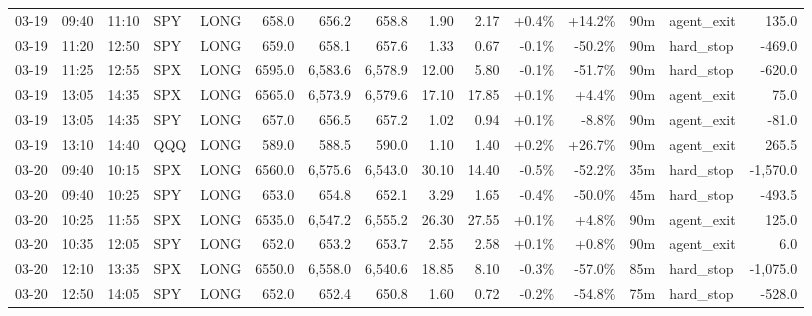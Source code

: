 \documentclass[11pt,a4paper,twoside]{article}
\begin{document}
\begin{landscape}
\begin{center}
\begin{longtable}{>{\color{txtmain}}l l l l l r r r r r r r r >{\color{txtmain}}l r}
03-19 & 09:40 & 11:10 & SPY & LONG & 658.0 & 656.2 & 658.8 & 1.90 & 2.17 & \textcolor{wingreen}{+0.4\%} & \textcolor{wingreen}{+14.2\%} & 90m & agent\_exit & \textcolor{wingreen}{135.0} \\
03-19 & 11:20 & 12:50 & SPY & LONG & 659.0 & 658.1 & 657.6 & 1.33 & 0.67 & \textcolor{lossred}{-0.1\%} & \textcolor{lossred}{-50.2\%} & 90m & hard\_stop & \textcolor{lossred}{-469.0} \\
03-19 & 11:25 & 12:55 & SPX & LONG & 6595.0 & 6,583.6 & 6,578.9 & 12.00 & 5.80 & \textcolor{lossred}{-0.1\%} & \textcolor{lossred}{-51.7\%} & 90m & hard\_stop & \textcolor{lossred}{-620.0} \\
03-19 & 13:05 & 14:35 & SPX & LONG & 6565.0 & 6,573.9 & 6,579.6 & 17.10 & 17.85 & \textcolor{wingreen}{+0.1\%} & \textcolor{wingreen}{+4.4\%} & 90m & agent\_exit & \textcolor{wingreen}{75.0} \\
03-19 & 13:05 & 14:35 & SPY & LONG & 657.0 & 656.5 & 657.2 & 1.02 & 0.94 & \textcolor{wingreen}{+0.1\%} & \textcolor{lossred}{-8.8\%} & 90m & agent\_exit & \textcolor{lossred}{-81.0} \\
03-19 & 13:10 & 14:40 & QQQ & LONG & 589.0 & 588.5 & 590.0 & 1.10 & 1.40 & \textcolor{wingreen}{+0.2\%} & \textcolor{wingreen}{+26.7\%} & 90m & agent\_exit & \textcolor{wingreen}{265.5} \\
03-20 & 09:40 & 10:15 & SPX & LONG & 6560.0 & 6,575.6 & 6,543.0 & 30.10 & 14.40 & \textcolor{lossred}{-0.5\%} & \textcolor{lossred}{-52.2\%} & 35m & hard\_stop & \textcolor{lossred}{-1,570.0} \\
03-20 & 09:40 & 10:25 & SPY & LONG & 653.0 & 654.8 & 652.1 & 3.29 & 1.65 & \textcolor{lossred}{-0.4\%} & \textcolor{lossred}{-50.0\%} & 45m & hard\_stop & \textcolor{lossred}{-493.5} \\
03-20 & 10:25 & 11:55 & SPX & LONG & 6535.0 & 6,547.2 & 6,555.2 & 26.30 & 27.55 & \textcolor{wingreen}{+0.1\%} & \textcolor{wingreen}{+4.8\%} & 90m & agent\_exit & \textcolor{wingreen}{125.0} \\
03-20 & 10:35 & 12:05 & SPY & LONG & 652.0 & 653.2 & 653.7 & 2.55 & 2.58 & \textcolor{wingreen}{+0.1\%} & \textcolor{wingreen}{+0.8\%} & 90m & agent\_exit & \textcolor{wingreen}{6.0} \\
03-20 & 12:10 & 13:35 & SPX & LONG & 6550.0 & 6,558.0 & 6,540.6 & 18.85 & 8.10 & \textcolor{lossred}{-0.3\%} & \textcolor{lossred}{-57.0\%} & 85m & hard\_stop & \textcolor{lossred}{-1,075.0} \\
03-20 & 12:50 & 14:05 & SPY & LONG & 652.0 & 652.4 & 650.8 & 1.60 & 0.72 & \textcolor{lossred}{-0.2\%} & \textcolor{lossred}{-54.8\%} & 75m & hard\_stop & \textcolor{lossred}{-528.0} \\

\end{longtable}
\end{center}
\end{landscape}
\end{document}
